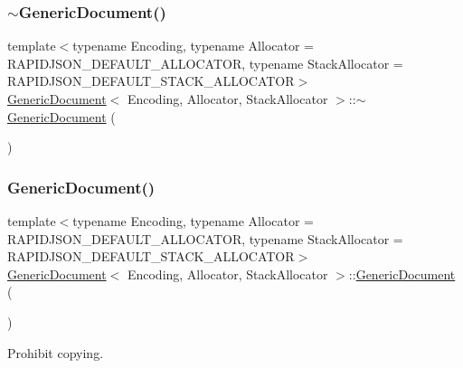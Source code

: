 \subsubsection{\texorpdfstring{$\sim$\+Generic\+Document()}{~GenericDocument()}}
{\footnotesize\ttfamily template$<$typename Encoding, typename Allocator = R\+A\+P\+I\+D\+J\+S\+O\+N\+\_\+\+D\+E\+F\+A\+U\+L\+T\+\_\+\+A\+L\+L\+O\+C\+A\+T\+OR, typename Stack\+Allocator = R\+A\+P\+I\+D\+J\+S\+O\+N\+\_\+\+D\+E\+F\+A\+U\+L\+T\+\_\+\+S\+T\+A\+C\+K\+\_\+\+A\+L\+L\+O\+C\+A\+T\+OR$>$ \\
\hyperlink{classGenericDocument}{Generic\+Document}$<$ Encoding, Allocator, Stack\+Allocator $>$\+::$\sim$\hyperlink{classGenericDocument}{Generic\+Document} (\begin{DoxyParamCaption}{ }\end{DoxyParamCaption})\hspace{0.3cm}{\ttfamily [inline]}}

\mbox{\label{classGenericDocument_a58dd6c300949aeb9627de7f9e34796db}} 
\subsubsection{\texorpdfstring{Generic\+Document()}{GenericDocument()}\hspace{0.1cm}{\footnotesize\ttfamily [3/3]}}
{\footnotesize\ttfamily template$<$typename Encoding, typename Allocator = R\+A\+P\+I\+D\+J\+S\+O\+N\+\_\+\+D\+E\+F\+A\+U\+L\+T\+\_\+\+A\+L\+L\+O\+C\+A\+T\+OR, typename Stack\+Allocator = R\+A\+P\+I\+D\+J\+S\+O\+N\+\_\+\+D\+E\+F\+A\+U\+L\+T\+\_\+\+S\+T\+A\+C\+K\+\_\+\+A\+L\+L\+O\+C\+A\+T\+OR$>$ \\
\hyperlink{classGenericDocument}{Generic\+Document}$<$ Encoding, Allocator, Stack\+Allocator $>$\+::\hyperlink{classGenericDocument}{Generic\+Document} (\begin{DoxyParamCaption}\item[{const \hyperlink{classGenericDocument}{Generic\+Document}$<$ Encoding, Allocator, Stack\+Allocator $>$ \&}]{ }\end{DoxyParamCaption})\hspace{0.3cm}{\ttfamily [private]}}



Prohibit copying. 



